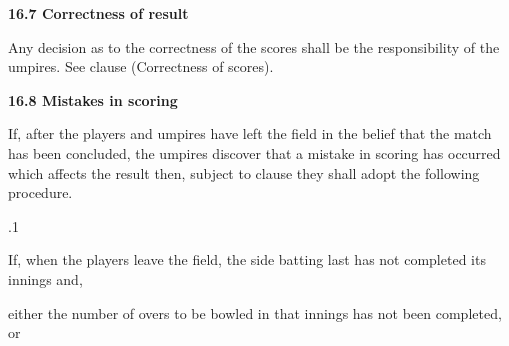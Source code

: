 \documentclass[12pt]{article}
\begin{document}
\vspace{\baselineskip}
{\fontsize{11pt}{13.2pt}\selectfont \textbf{16.7 \tabto{0.47in} Correctness of result}\par}\par


\vspace{\baselineskip}
\begin{adjustwidth}{0.0in}{0.62in}
{\fontsize{9pt}{10.8pt}\selectfont Any decision as to the correctness of the scores shall be the responsibility of the umpires. See clause  (Correctness of scores).\par}\par

\end{adjustwidth}


\vspace{\baselineskip}
{\fontsize{11pt}{13.2pt}\selectfont \textbf{16.8 \tabto{0.47in} Mistakes in scoring}\par}\par


\vspace{\baselineskip}
\begin{adjustwidth}{0.0in}{0.08in}
{\fontsize{9pt}{10.8pt}\selectfont If, after the players and umpires have left the field in the belief that the match has been concluded, the umpires discover that a mistake in scoring has occurred which affects the result then, subject to clause they shall adopt the following procedure.\par}\par

\end{adjustwidth}


\vspace{\baselineskip}
{\fontsize{9pt}{10.8pt}.1 \tabto{0.49in} {\fontsize{8pt}{9.6pt}\selectfont If, when the players leave the field, the side batting last has not completed its innings and,\par}\par}\par


\vspace{\baselineskip}
\begin{adjustwidth}{0.5in}{0.0in}
{\fontsize{9pt}{10.8pt}\selectfont either the number of overs to be bowled in that innings has not been completed, or\par}\par

\end{adjustwidth}
\end{document}
